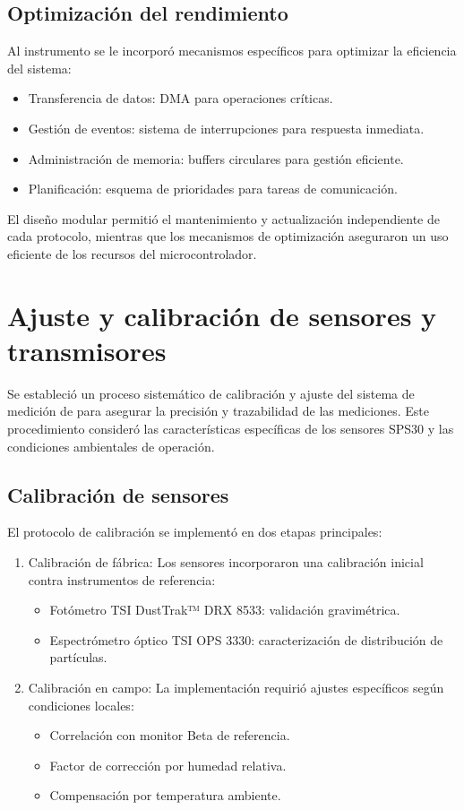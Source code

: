 \subsection{Optimización del rendimiento}
Al instrumento se le incorporó mecanismos específicos para optimizar la eficiencia del sistema:
\begin{itemize}
	\item Transferencia de datos: DMA para operaciones críticas.
	\item Gestión de eventos: sistema de interrupciones para respuesta inmediata.
	\item Administración de memoria: buffers circulares para gestión eficiente.
	\item Planificación: esquema de prioridades para tareas de comunicación.
\end{itemize}

El diseño modular permitió el mantenimiento y actualización independiente de cada protocolo, mientras que los mecanismos de optimización aseguraron un uso eficiente de los recursos del microcontrolador.

	
\section{Ajuste y calibración de sensores y transmisores}
Se estableció un proceso sistemático de calibración y ajuste del sistema de medición de \MPF para asegurar la precisión y trazabilidad de las mediciones. Este procedimiento consideró las características específicas de los sensores SPS30 y las condiciones ambientales de operación.
\subsection{Calibración de sensores \MPF}
El protocolo de calibración se implementó en dos etapas principales:
\begin{enumerate}
	\item Calibración de fábrica: Los sensores incorporaron una calibración inicial contra instrumentos de referencia:
	\begin{itemize}
		\item Fotómetro TSI DustTrak™ DRX 8533: validación gravimétrica.
		\item Espectrómetro óptico TSI OPS 3330: caracterización de distribución de partículas.
	\end{itemize}
	\item Calibración en campo: La implementación requirió ajustes específicos según condiciones locales:

	\begin{itemize}
		\item Correlación con monitor Beta de referencia.
		\item Factor de corrección por humedad relativa.
		\item Compensación por temperatura ambiente.
	\end{itemize}
\end{enumerate}


